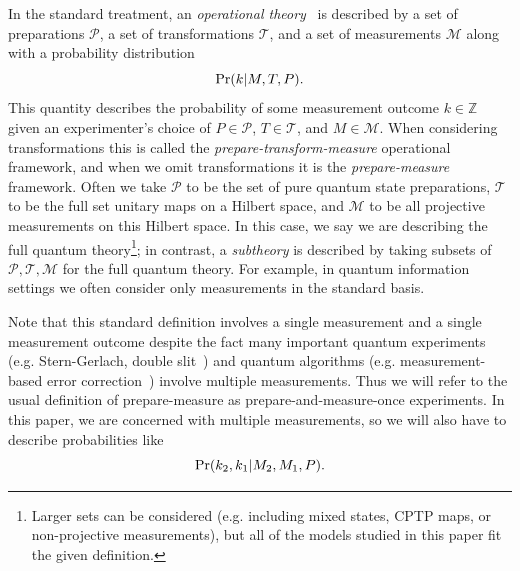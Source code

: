 \documentclass[%
 reprint,
superscriptaddress,
nofootinbib,
 amsmath,amssymb,
 prx, 
 accepted=2019-09-27,
]{quantumarticle}
\newcommand{\Z}{\mathbb{Z}}
\renewcommand{\Pr}{\textup{Pr}}
\begin{document}
In the standard treatment, an \emph{operational
  theory}~\cite{SpekkensContextualitypreparationstransformations2005}
is described by a set of preparations $\mathcal P$, a set of
transformations $\mathcal T$, and a set of measurements $\mathcal M$
along with a probability distribution
\begin{equation}
  \label{eq:40}
  \Pr(k|M,T,P).
\end{equation}
This quantity describes the probability of some measurement outcome
$k\in\Z$ given an experimenter's choice of $P\in\mathcal P$,
$T\in\mathcal T$, and $M\in\mathcal M$. When considering
transformations this is called the \emph{prepare-transform-measure}
operational framework, and when we omit transformations it is the
\emph{prepare-measure} framework. Often we take $\mathcal P$ to be the
set of pure quantum state preparations, $\mathcal T$ to be the full
set unitary maps on a Hilbert space, and $\mathcal M$ to be all
projective measurements on this Hilbert space. In this case, we say we
are describing the full quantum theory\footnote{Larger sets can be
  considered (e.g. including mixed states, CPTP maps, or
  non-projective measurements), but all of the models studied in this
  paper fit the given definition.}; in contrast, a \emph{subtheory} is
described by taking subsets of $\mathcal P,\mathcal T,\mathcal M$ for
the full quantum theory. For example, in quantum information settings
we often consider only measurements in the standard basis.


Note that this standard definition involves a single measurement and a
single measurement outcome despite the fact many important quantum
experiments (e.g. Stern-Gerlach, double
slit~\cite{SakuraiModernquantummechanics2011}) and quantum algorithms
(e.g. measurement-based error
correction~\cite{GottesmanIntroductionQuantumError2009}) involve
multiple measurements. Thus we will refer to the usual definition of
prepare-measure as prepare-and-measure-once experiments. In this
paper, we are concerned with multiple measurements, so we will also
have to describe probabilities like
\begin{equation}
  \label{eq:41}
  \Pr(k_2,k_1|M_2,M_1,P).
\end{equation}
\end{document}
